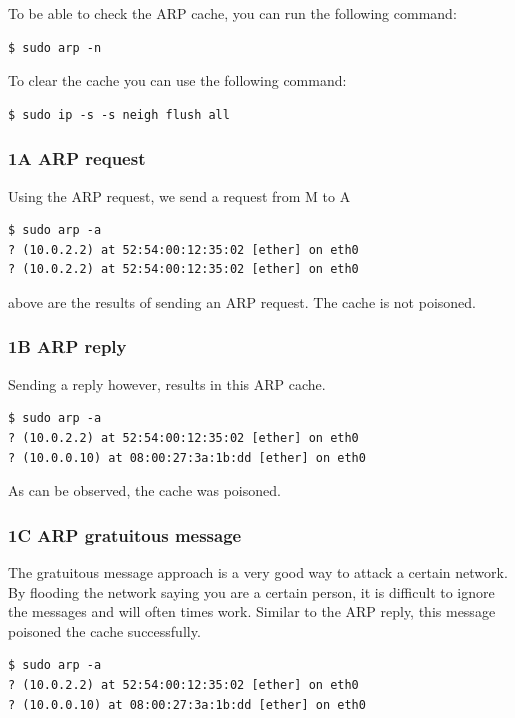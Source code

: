 \documentclass[12pt]{article}
\begin{document}
To be able to check the ARP cache, you can run the following command:
\begin{verbatim}
$ sudo arp -n
\end{verbatim}

To clear the cache you can use the following command:
\begin{verbatim}
$ sudo ip -s -s neigh flush all
\end{verbatim}

\subsubsection{1A ARP request}
Using the ARP request, we send a request from M to A

\begin{verbatim}
$ sudo arp -a
? (10.0.2.2) at 52:54:00:12:35:02 [ether] on eth0
? (10.0.2.2) at 52:54:00:12:35:02 [ether] on eth0
\end{verbatim}

above are the results of sending an ARP request. The cache is not poisoned.

\subsubsection{1B ARP reply}
Sending a reply however, results in this ARP cache.
\begin{verbatim}
$ sudo arp -a
? (10.0.2.2) at 52:54:00:12:35:02 [ether] on eth0
? (10.0.0.10) at 08:00:27:3a:1b:dd [ether] on eth0
\end{verbatim}
As can be observed, the cache was poisoned.

\subsubsection{1C ARP gratuitous message}
The gratuitous message approach is a very good way to attack a certain network. By flooding the network saying you are a certain person, it is difficult to ignore the messages and will often times work. Similar to the ARP reply, this message poisoned the cache successfully.

\begin{verbatim}
$ sudo arp -a
? (10.0.2.2) at 52:54:00:12:35:02 [ether] on eth0
? (10.0.0.10) at 08:00:27:3a:1b:dd [ether] on eth0
\end{verbatim}
\end{document}
